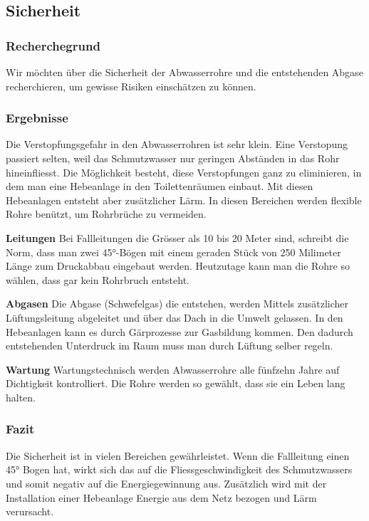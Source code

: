 \subsection{Sicherheit}


\subsubsection{Recherchegrund}
Wir möchten über die Sicherheit der Abwasserrohre und die entstehenden Abgase recherchieren, um gewisse Risiken einschätzen zu können. 

\subsubsection{Ergebnisse}

Die Verstopfungsgefahr in den Abwasserrohren ist sehr klein. Eine Verstopung passiert selten, weil das Schmutzwasser nur geringen Abständen in das Rohr hineinfliesst. Die Möglichkeit besteht, diese Verstopfungen ganz zu eliminieren, in dem man eine Hebeanlage in den Toilettenräumen einbaut. Mit diesen Hebeanlagen entsteht aber zusätzlicher Lärm. In diesen Bereichen werden flexible Rohre benützt, um Rohrbrüche zu vermeiden.

\textbf{Leitungen}
Bei Fallleitungen die Grösser als 10 bis 20 Meter sind, schreibt die Norm, dass man zwei 45°-Bögen mit einem geraden Stück von 250 Milimeter Länge zum Druckabbau eingebaut werden. Heutzutage kann man die Rohre so wählen, dass gar kein Rohrbruch entsteht.

\textbf{Abgasen}
Die Abgase (Schwefelgas) die entstehen, werden Mittels zusätzlicher Lüftungsleitung abgeleitet und über das Dach in die Umwelt gelassen. In den Hebeanlagen kann es durch Gärprozesse zur Gasbildung kommen. Den dadurch entstehenden Unterdruck im Raum muss man durch Lüftung selber regeln. 

\textbf{Wartung}
Wartungstechnisch werden Abwasserrohre alle fünfzehn Jahre auf Dichtigkeit kontrolliert. Die Rohre werden so gewählt, dass sie ein Leben lang halten.

\subsubsection{Fazit}

Die Sicherheit ist in vielen Bereichen gewährleistet. Wenn die Fallleitung einen 45° Bogen hat, wirkt sich das auf die Fliessgeschwindigkeit des Schmutzwassers und somit negativ auf die Energiegewinnung aus. Zusätzlich wird mit der Installation einer Hebeanlage Energie aus dem Netz bezogen und Lärm verursacht.

\clearpage 





